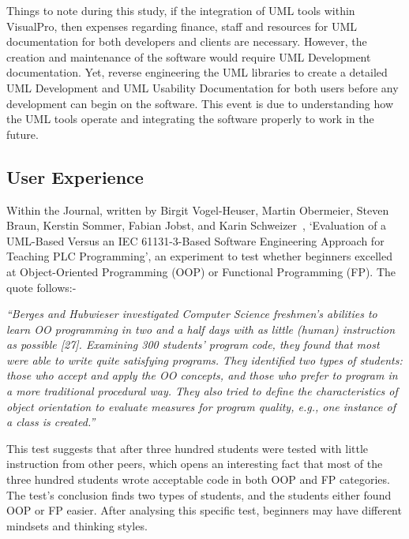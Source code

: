 \documentclass[12pt]{report} %
\begin{document}
			Things to note during this study, if the integration of UML tools within VisualPro, then expenses regarding finance, staff and resources for UML documentation for both developers and clients are necessary. However, the creation and maintenance of the software would require UML Development documentation. Yet, reverse engineering the UML libraries to create a detailed UML Development and UML Usability Documentation for both users before any development can begin on the software. This event is due to understanding how the UML tools operate and integrating the software properly to work in the future.

		\subsection{User Experience}
		\label{subsec:userExperience}
			Within the Journal, written by Birgit Vogel-Heuser, Martin Obermeier, Steven Braun, Kerstin Sommer, Fabian Jobst, and Karin Schweizer~\cite{vogel-heuser_evaluation_2013}, `Evaluation of a UML-Based Versus an IEC 61131-3-Based Software Engineering Approach for Teaching PLC Programming', an experiment to test whether beginners excelled at Object-Oriented Programming (OOP) or Functional Programming (FP). The quote follows:-

			\begin{center}
				\textit{``Berges and Hubwieser investigated Computer Science freshmen’s abilities to learn OO programming in two and a half days with as little (human) instruction as possible [27]. Examining 300 students’ program code, they found that most were able to write quite satisfying programs. They identified two types of students: those who accept and apply the OO concepts, and those who prefer to program in a more traditional procedural way. They also tried to define the characteristics of object orientation to evaluate measures for program quality, e.g., one instance of a class is created.''}~\cite{vogel-heuser_evaluation_2013}
			\end{center}

			This test suggests that after three hundred students were tested with little instruction from other peers, which opens an interesting fact that most of the three hundred students wrote acceptable code in both OOP and FP categories. The test's conclusion finds two types of students, and the students either found OOP or FP easier. After analysing this specific test, beginners may have different mindsets and thinking styles.
			
\end{document}
